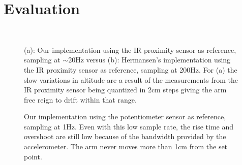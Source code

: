 \section{Evaluation}\label{sec:evaluation}
\begin{figure}
	\centering
	\subfloat[][]{\setlength\figureheight{4cm}
		\setlength\figurewidth{7cm}
		
	} \\
	\subfloat[][]{\setlength\figureheight{4cm}
		\setlength\figurewidth{7cm}
		
	}
	\caption{(a): Our implementation using the IR proximity sensor as reference, sampling at \(\sim\)20Hz versus (b): 
	Hermansen's implementation using the IR proximity sensor as reference, sampling at 200Hz. For (a) the slow variations in 
altitude are a result of the measurements from the IR proximity sensor being quantized in 2cm steps giving the arm
free reign to drift within that range.}
	\label{fig:irtest}
\end{figure}

\begin{figure}
	\setlength\figureheight{4cm}
	\setlength\figurewidth{7cm}
	
	\caption{Our implementation using the potentiometer sensor as reference, sampling at 1Hz. Even with this low sample rate, the
		rise time and overshoot are still low because of the bandwidth provided by the accelerometer. The arm never moves more than
		1cm from the set point.}
	\label{fig:pot1hztest}
\end{figure}

\begin{figure}
	\setlength\figureheight{4cm}
	\setlength\figurewidth{7cm}
	
	\label{fig:ultratest}
\end{figure}
	
